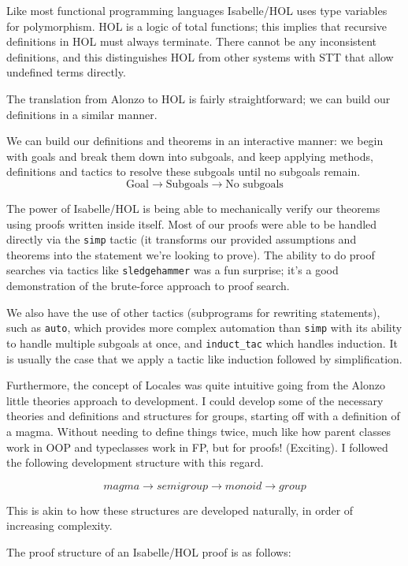 \documentclass{article}
\begin{document}
Like most functional programming languages Isabelle/HOL uses type variables for polymorphism.
HOL is a logic of total functions; this implies that recursive definitions in HOL must always terminate.
There cannot be any inconsistent definitions, and this distinguishes HOL from other systems with STT that allow undefined terms directly.

The translation from Alonzo to HOL is fairly straightforward; we can build our definitions
in a similar manner.

We can build our definitions and theorems in an interactive manner:
we begin with goals and break them down into subgoals, and keep applying methods, definitions and tactics to resolve these
subgoals until no subgoals remain.
\[\text{Goal} \to \text{Subgoals} \to \text{No subgoals}\]

\cite{nipkow2002isabelle}

The power of Isabelle/HOL is being able to mechanically verify our theorems using proofs written
inside itself. Most of our proofs were able to be handled directly via the \texttt{simp}
tactic (it transforms our provided assumptions and theorems into the statement we're looking to prove).
The ability to do proof searches via tactics like \texttt{sledgehammer} was a fun surprise;
it's a good demonstration of the brute-force approach to proof search.

We also have the use of other tactics (subprograms for rewriting statements), such as \texttt{auto}, which
provides more complex automation than \texttt{simp} with its ability to handle multiple subgoals at once,
and \texttt{induct\_tac} which handles induction. It is usually the case that we apply a tactic like induction followed by simplification.

Furthermore, the concept of Locales was quite intuitive going from the Alonzo little theories approach to development. I could
develop some of the necessary theories and definitions and structures for groups, starting off with a definition
of a magma. Without needing to define things twice, much like how parent classes work in OOP and typeclasses work in
FP, but for proofs! (Exciting). I followed the following development structure with this regard.

\[magma \to semigroup \to monoid \to group \]

This is akin to how these structures are developed naturally, in order of increasing complexity.

The proof structure of an Isabelle/HOL proof is as follows:
\end{document}
